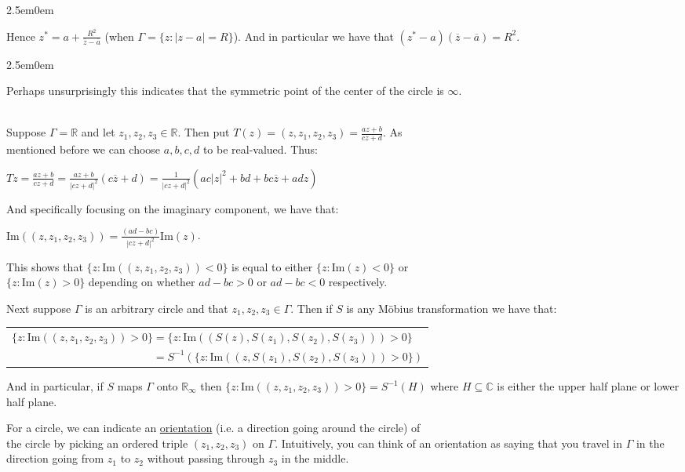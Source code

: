 \documentclass{book}
\newcommand{\hTwo}{%
\color{Black}%
   \fontsize{13}{15}\selectfont%
}
\newcommand{\myComment}{%
   \color{RawerSienna}%
   \fontsize{12}{14}\selectfont%
}
\newenvironment{myIndent}{%
   \begin{adjustwidth}{2.5em}{0em}%
}{%
   \end{adjustwidth}%
}
\newcommand{\udefine}[1]{{%
   \setulcolor{Red}%
   \setul{0.14em}{0.07em}%
   \ul{#1}%
}}
\newcommand{\ima}[1]{\mathrm{Im}(#1)}
\newcommand{\mySepTwo}[1][.]{%
   {\noindent\color{#1}{\rule{6.5in}{0.5mm}}}\\%
}
\newcommand{\retTwo}{\hfill\bigbreak}
\begin{document}
\begin{myIndent}
	Hence $z^* = a + \frac{R^2}{\overline{z} - \overline{a}}$ (when $\Gamma = \{z : |z - a| = R\}$). And in particular we have that $(z^* - a)(\overline{z} - \overline{a}) = R^2$.

	\begin{myIndent}\myComment
		Perhaps unsurprisingly this indicates that the symmetric point of the center of the circle is $\infty$.\retTwo
	\end{myIndent}
\end{myIndent}

\hTwo\mySepTwo

Suppose $\Gamma = \mathbb{R}$ and let $z_1, z_2, z_3 \in \mathbb{R}$. Then put $T(z) = (z, z_1, z_2, z_3) = \frac{az + b}{cz + d}$. As\\ mentioned before we can choose $a, b, c, d$ to be real-valued. Thus:

{\centering $Tz = \frac{az + b}{cz + d} = \frac{az + b}{|cz + d|^2}(c\overline{z} + d) = \frac{1}{|cz + d|^2} (ac|z|^2 + bd + bc\overline{z} + adz)$ \retTwo\par}

And specifically focusing on the imaginary component, we have that:

{\centering$\ima{(z, z_1, z_2, z_3)} = \frac{(ad - bc)}{|cz + d|^2}\ima{z}$.\retTwo\par}

This shows that $\{z : \ima{(z, z_1, z_2, z_3)} < 0\}$ is equal to either $\{z : \ima{z} < 0\}$ or\\ $\{z : \ima{z} > 0\}$ depending on whether $ad - bc > 0$ or $ad - bc < 0$ respectively.\retTwo

Next suppose $\Gamma$ is an arbitrary circle and that $z_1, z_2, z_3 \in \Gamma$. Then if $S$ is any Möbius transformation we have that:

{\centering\begin{tabular}{l}
	$\{z : \ima{(z, z_1, z_2, z_3)} > 0\} = \{z : \ima{(S(z), S(z_1), S(z_2), S(z_3))} > 0\}$\\ [4pt]
	$\phantom{\{z : \ima{(z, z_1, z_2, z_3)} > 0\}} = S^{-1}(\{z : \ima{(z, S(z_1), S(z_2), S(z_3))} > 0\})$ 
\end{tabular}\retTwo\par}

And in particular, if $S$ maps $\Gamma$ onto $\mathbb{R}_\infty$ then $\{z : \ima{(z, z_1, z_2, z_3)} > 0\} = S^{-1}(H)$ where $H \subseteq \mathbb{C}$ is either the upper half plane or lower half plane.\retTwo

For a circle, we can indicate an \udefine{orientation} (i.e. a direction going around the circle) of\\ the circle by picking an ordered triple $(z_1, z_2, z_3)$ on $\Gamma$. Intuitively, you can think of an orientation as saying that you travel in $\Gamma$ in the direction going from $z_1$ to $z_2$ without passing through $z_3$ in the middle.\retTwo
\end{document}
